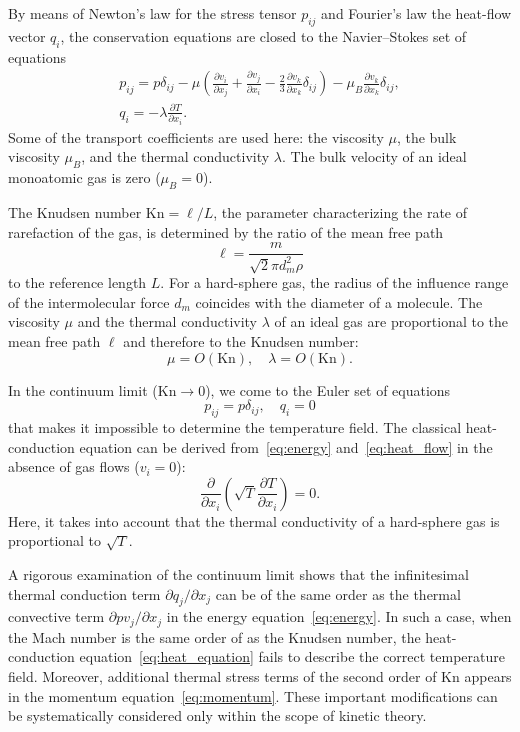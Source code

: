 \documentclass[smallextended, referee]{svjour3} %
\newcommand{\Kn}{\mathrm{Kn}}
\newcommand{\pder}[2][]{\frac{\partial#1}{\partial#2}}
\newcommand{\Pder}[2][]{\partial#1/\partial#2}
\begin{document}
By means of Newton's law for the stress tensor \(p_{ij}\) and Fourier's law the heat-flow vector \(q_i\),
the conservation equations are closed to the Navier--Stokes set of equations
\begin{gather}
	p_{ij} = p\delta_{ij} - \mu\left(\pder[v_i]{x_j}+\pder[v_j]{x_i}-\frac23\pder[v_k]{x_k}\delta_{ij}\right) -
		\mu_B\pder[v_k]{x_k}\delta_{ij}, \label{eq:stress_tensor}\\
	q_i = -\lambda\pder[T]{x_i}. \label{eq:heat_flow}
\end{gather}
Some of the transport coefficients are used here:
the viscosity \(\mu\), the bulk viscosity \(\mu_B\), and the thermal conductivity \(\lambda\).
The bulk velocity of an ideal monoatomic gas is zero (\(\mu_B = 0\)).

The Knudsen number \(\Kn = \ell/L\), the parameter characterizing the rate of rarefaction of the gas,
is determined by the ratio of the mean free path \[ \ell = \frac{m}{\sqrt2\pi d_m^2 \rho} \]
to the reference length \(L\).
For a hard-sphere gas, the radius of the influence range of the intermolecular force \(d_m\)
coincides with the diameter of a molecule.
The viscosity \(\mu\) and the thermal conductivity \(\lambda\) of an ideal gas
are proportional to the mean free path \(\ell\) and therefore to the Knudsen number:
\begin{equation}
	\mu = O(\Kn), \quad \lambda = O(\Kn).
\end{equation}

In the continuum limit (\(\Kn\to0\)), we come to the Euler set of equations
\begin{equation}
	p_{ij} = p\delta_{ij}, \quad q_i = 0
\end{equation}
that makes it impossible to determine the temperature field.
The classical heat-conduction equation
can be derived from~\eqref{eq:energy} and~\eqref{eq:heat_flow}
in the absence of gas flows (\(v_i = 0\)):
\begin{equation}\label{eq:heat_equation}
	\pder{x_i}\left(\sqrt{T}\pder[T]{x_i}\right) = 0.
\end{equation}
Here, it takes into account that the thermal conductivity of a hard-sphere gas
is proportional to \(\sqrt{T}\).

A rigorous examination of the continuum limit shows that the infinitesimal thermal conduction term \(\Pder[q_j]{x_j}\)
can be of the same order as the thermal convective term \(\Pder[pv_j]{x_j}\) in the energy equation~\eqref{eq:energy}.
In such a case, when the Mach number is the same order of as the Knudsen number,
the heat-conduction equation~\eqref{eq:heat_equation} fails to describe
the correct temperature field. Moreover, additional thermal stress terms of the second order of \(\Kn\)
appears in the momentum equation~\eqref{eq:momentum}.
These important modifications can be systematically considered only within the scope of kinetic theory.
\end{document}
